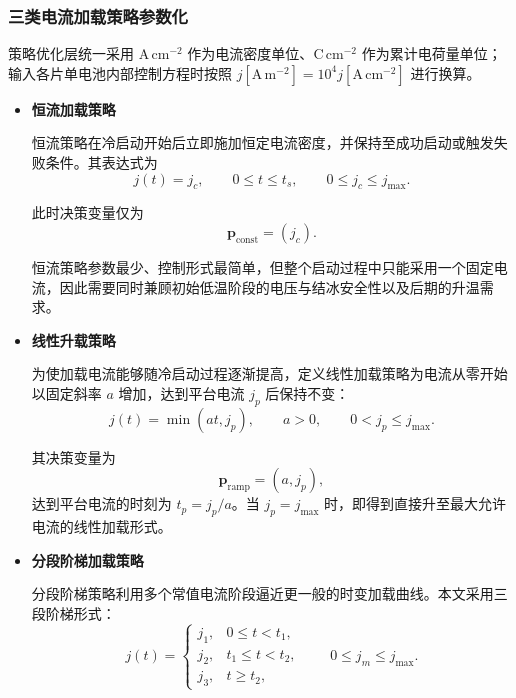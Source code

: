 \documentclass[bwprint]{gmcmthesis}
\numberwithin{figure}{section}
\begin{document}
\subsubsection{三类电流加载策略参数化}
策略优化层统一采用 \(\mathrm{A\,cm^{-2}}\) 作为电流密度单位、\(\mathrm{C\,cm^{-2}}\) 作为累计电荷量单位；输入各片单电池内部控制方程时按照
\(j[\mathrm{A\,m^{-2}}]=10^4j[\mathrm{A\,cm^{-2}}]\)
进行换算。

\begin{itemize}
\renewcommand{\labelitemi}{$\blacktriangleright$}
\item \textbf {恒流加载策略}

\noindent 恒流策略在冷启动开始后立即施加恒定电流密度，并保持至成功启动或触发失败条件。其表达式为
\begin{equation}
j(t) = j_c, \qquad 0 \leq t \leq t_s, \qquad 0 \leq j_c \leq j_{\text{max}}. \tag{5-51}
\end{equation}

\noindent 此时决策变量仅为
\[
\mathbf{p}_{\text{const}} = (j_c).
\]

\noindent 恒流策略参数最少、控制形式最简单，但整个启动过程中只能采用一个固定电流，因此需要同时兼顾初始低温阶段的电压与结冰安全性以及后期的升温需求。


\item \textbf {线性升载策略}

\noindent 为使加载电流能够随冷启动过程逐渐提高，定义线性加载策略为电流从零开始以固定斜率 \(a\) 增加，达到平台电流 \(j_p\) 后保持不变：
\begin{equation}
j(t) = \min(at, j_p), \qquad a > 0, \qquad 0 < j_p \leq j_{\text{max}}. \tag{5-52}
\end{equation}

\noindent 其决策变量为
\[
\mathbf{p}_{\text{ramp}} = (a, j_p),
\]
达到平台电流的时刻为 \(t_p = j_p / a\)。当 \(j_p = j_{\text{max}}\) 时，即得到直接升至最大允许电流的线性加载形式。

\item \textbf {分段阶梯加载策略}

\noindent 分段阶梯策略利用多个常值电流阶段逼近更一般的时变加载曲线。本文采用三段阶梯形式：
\begin{equation}
j(t) = \begin{cases}
j_1, & 0 \leq t < t_1, \\
j_2, & t_1 \leq t < t_2, \\
j_3, & t \geq t_2,
\end{cases} \qquad 0 \leq j_m \leq j_{\text{max}}. \tag{5-53}
\end{equation}


\end{itemize}
\end{document}
